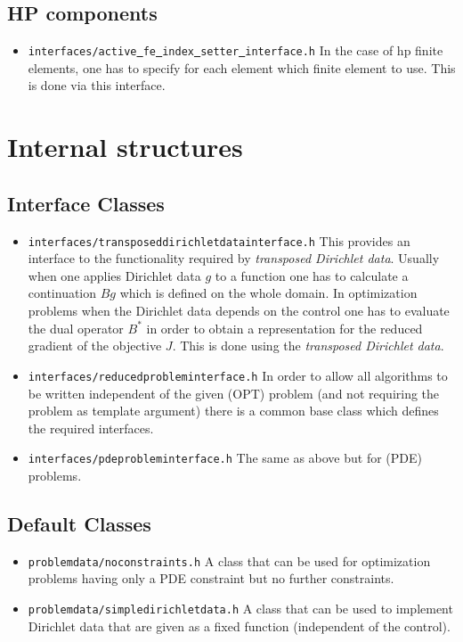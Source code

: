 \subsection{HP components}
\begin{itemize}
\item \texttt{interfaces/active\underline{ }fe\underline{ }index\underline{ }setter\underline{ }interface.h} In the case of hp finite elements, one has to specify for each element which finite element to use. This is done via this interface.
\end{itemize}

\section{Internal structures}
\subsection{Interface Classes}
\begin{itemize}
  \item \texttt{interfaces/transposeddirichletdatainterface.h} This provides an interface to 
    the functionality required by {\em transposed Dirichlet data}. Usually when one applies Dirichlet 
    data $g$ to a function one has to calculate a continuation $Bg$ which is defined on the whole domain.
    In optimization problems when the Dirichlet data depends on the control one has to evaluate the 
    dual operator $B^*$ in order to obtain a representation for the reduced gradient of the objective $J$.
    This is done using the {\em transposed Dirichlet data}.
  \item \texttt{interfaces/reducedprobleminterface.h} In order to allow all algorithms to be written independent
    of the given (OPT) problem 
    (and not requiring the problem as template argument) there is a common base class which 
    defines the required interfaces. 
  \item \texttt{interfaces/pdeprobleminterface.h} The same as above but for (PDE) problems.
\end{itemize}

\subsection{Default Classes}
\begin{itemize}
  \item \texttt{problemdata/noconstraints.h} A class that can be used for optimization problems 
    having only a PDE constraint but no further constraints.
  \item \texttt{problemdata/simpledirichletdata.h} A class that can be used to implement Dirichlet
    data that are given as a fixed function (independent of the control).
  \end{itemize}

